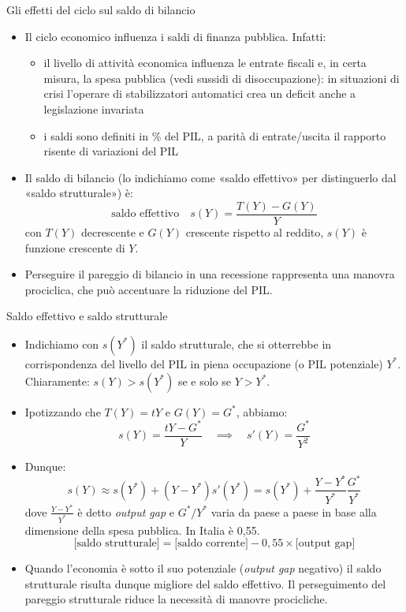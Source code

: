 \documentclass[aspectratio=149,11pt,italian]{beamer}
\begin{document}
\begin{frame}{Gli effetti del ciclo sul saldo di bilancio}
\begin{itemize}
\item Il ciclo economico influenza i saldi di finanza pubblica. Infatti:
\begin{itemize}
\item il livello di attività economica influenza le entrate fiscali e, in certa
misura, la spesa pubblica (vedi sussidi di disoccupazione): in situazioni di
crisi l'operare di \alert{stabilizzatori automatici} crea un deficit anche a
legislazione invariata
\item i saldi sono definiti in \% del PIL, a parità di entrate/uscita il rapporto
risente di variazioni del PIL
\end{itemize}
\item Il saldo di bilancio (lo indichiamo come «saldo effettivo» per distinguerlo
dal «saldo strutturale») è:
\begin{equation*}
  \text{saldo effettivo}\quad s(Y)=\frac{T(Y)-G(Y)}{Y}
\end{equation*}
con $T(Y)$ decrescente e $G(Y)$ crescente rispetto al reddito, $s(Y)$ è
funzione crescente di $Y$.
\item Perseguire il pareggio di bilancio in una recessione rappresenta una manovra
\alert{prociclica}, che può accentuare la riduzione del PIL.
\end{itemize}
\end{frame}

\begin{frame}{Saldo effettivo e saldo strutturale}
\begin{itemize}
\item Indichiamo con $s(Y^*)$ il \alert{saldo strutturale}, che si otterrebbe in
corrispondenza del livello del PIL in piena occupazione (o PIL potenziale)
$Y^*$. Chiaramente: $s(Y)>s(Y^*)$ se e solo se $Y>Y^*$.
\item Ipotizzando che $T(Y)=tY$ e $G(Y)=G^*$, abbiamo:
\begin{equation*}
  s(Y)=\frac{tY - G^*}{Y} \quad\implies\quad s'(Y)=\frac{G^*}{Y^2}
\end{equation*}
\item Dunque:
\begin{equation*}
s(Y)\approx s(Y^*)+(Y-Y^*)s'(Y^*)=s(Y^*)+\frac{Y-Y^*}{Y^*}\frac{G^*}{Y^*}
\end{equation*}
dove $\frac{Y-Y^*}{Y^*}$ è detto \emph{output gap} e $G^*/Y^*$ varia da paese a
paese in base alla dimensione della spesa pubblica. In Italia è 0,55.
\begin{equation*}
\text{[saldo strutturale]} = \text{[saldo corrente]} -  0,\!55 \times\text{[output gap]}
\end{equation*}
\item Quando l'economia è sotto il suo potenziale (\emph{output gap} negativo) il saldo
strutturale risulta dunque migliore del saldo effettivo. Il perseguimento del
pareggio strutturale riduce la necessità di manovre procicliche.
\end{itemize}
\end{frame}
\end{document}
